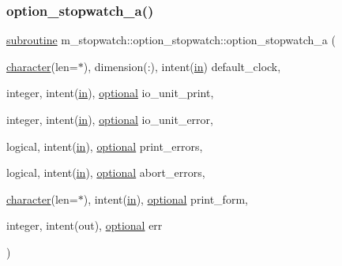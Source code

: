 \subsubsection{\texorpdfstring{option\+\_\+stopwatch\+\_\+a()}{option\_stopwatch\_a()}}
{\footnotesize\ttfamily \hyperlink{M__stopwatch_83_8txt_acfbcff50169d691ff02d4a123ed70482}{subroutine} m\+\_\+stopwatch\+::option\+\_\+stopwatch\+::option\+\_\+stopwatch\+\_\+a (\begin{DoxyParamCaption}\item[{\hyperlink{option__stopwatch_83_8txt_abd4b21fbbd175834027b5224bfe97e66}{character}(len=$\ast$), dimension(\+:), intent(\hyperlink{M__journal_83_8txt_afce72651d1eed785a2132bee863b2f38}{in})}]{default\+\_\+clock,  }\item[{integer, intent(\hyperlink{M__journal_83_8txt_afce72651d1eed785a2132bee863b2f38}{in}), \hyperlink{option__stopwatch_83_8txt_aa4ece75e7acf58a4843f70fe18c3ade5}{optional}}]{io\+\_\+unit\+\_\+print,  }\item[{integer, intent(\hyperlink{M__journal_83_8txt_afce72651d1eed785a2132bee863b2f38}{in}), \hyperlink{option__stopwatch_83_8txt_aa4ece75e7acf58a4843f70fe18c3ade5}{optional}}]{io\+\_\+unit\+\_\+error,  }\item[{logical, intent(\hyperlink{M__journal_83_8txt_afce72651d1eed785a2132bee863b2f38}{in}), \hyperlink{option__stopwatch_83_8txt_aa4ece75e7acf58a4843f70fe18c3ade5}{optional}}]{print\+\_\+errors,  }\item[{logical, intent(\hyperlink{M__journal_83_8txt_afce72651d1eed785a2132bee863b2f38}{in}), \hyperlink{option__stopwatch_83_8txt_aa4ece75e7acf58a4843f70fe18c3ade5}{optional}}]{abort\+\_\+errors,  }\item[{\hyperlink{option__stopwatch_83_8txt_abd4b21fbbd175834027b5224bfe97e66}{character}(len=$\ast$), intent(\hyperlink{M__journal_83_8txt_afce72651d1eed785a2132bee863b2f38}{in}), \hyperlink{option__stopwatch_83_8txt_aa4ece75e7acf58a4843f70fe18c3ade5}{optional}}]{print\+\_\+form,  }\item[{integer, intent(out), \hyperlink{option__stopwatch_83_8txt_aa4ece75e7acf58a4843f70fe18c3ade5}{optional}}]{err }\end{DoxyParamCaption})\hspace{0.3cm}{\ttfamily [private]}}

\mbox{\label{interfacem__stopwatch_1_1option__stopwatch_a8732d3375492140b0a18f5e78afc8f52}} 
